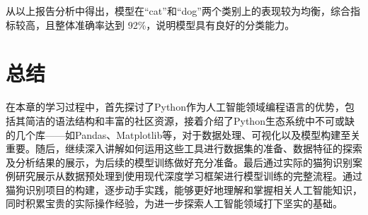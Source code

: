 从以上报告分析中得出，模型在“cat”和“dog”两个类别上的表现较为均衡，综合指标较高，且整体准确率达到 92\%，说明模型具有良好的分类能力。

\section{总结}

在本章的学习过程中，首先探讨了Python作为人工智能领域编程语言的优势，包括其简洁的语法结构和丰富的社区资源，接着介绍了Python生态系统中不可或缺的几个库——如Pandas、Matplotlib等，对于数据处理、可视化以及模型构建至关重要。随后，继续深入讲解如何运用这些工具进行数据集的准备、数据特征的探索及分析结果的展示，为后续的模型训练做好充分准备。最后通过实际的猫狗识别案例研究展示从数据预处理到使用现代深度学习框架进行模型训练的完整流程。通过猫狗识别项目的构建，逐步动手实践，能够更好地理解和掌握相关人工智能知识，同时积累宝贵的实际操作经验，为进一步探索人工智能领域打下坚实的基础。

